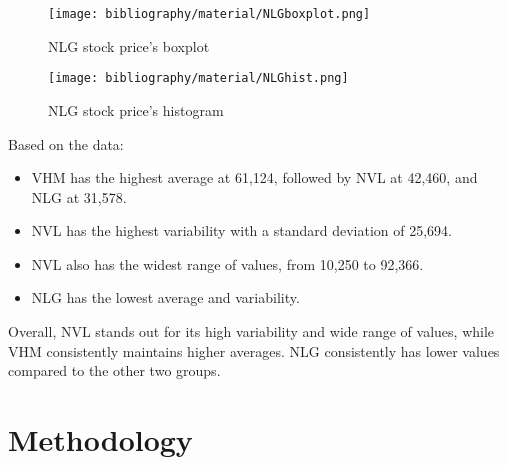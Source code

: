 \documentclass{ieeeojies}
\begin{document}
	\begin{figure}[H]
		\centering
		\begin{minipage}{0.23\textwidth}
			\centering
			\texttt{[image: bibliography/material/NLGboxplot.png]}
			\caption{NLG stock price's boxplot}
			\label{fig:1}
		\end{minipage}
		\hfill
		\begin{minipage}{0.23\textwidth}
			\centering
			\texttt{[image: bibliography/material/NLGhist.png]}
			\caption{NLG stock price's histogram}
			\label{fig:2}
		\end{minipage}
	\end{figure}
	\newpage
	Based on the data:
	\begin{itemize}
		\item VHM has the highest average at 61,124, followed by NVL at 42,460, and NLG at
		31,578.
		\item NVL has the highest variability with a standard deviation of 25,694.
		\item NVL also has the widest range of values, from 10,250 to 92,366.
		\item NLG has the lowest average and variability.
	\end{itemize}
	Overall, NVL stands out for its high variability and wide range of values, while VHM consistently maintains higher averages. NLG consistently has lower values compared to the other two groups.
	
	
	\section{Methodology}
\end{document}
